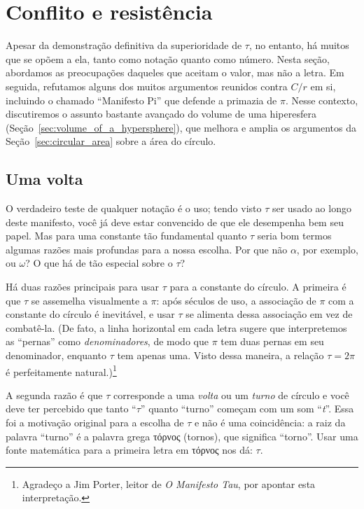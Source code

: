 {    %


\section{Conflito e resistência} %
\label{sec:conflict_and_resistance}

Apesar da demonstração definitiva da superioridade de $\tau$, no entanto, há muitos que se opõem a ela, tanto como notação quanto como número. Nesta seção, abordamos as preocupações daqueles que aceitam o valor, mas não a letra. Em seguida, refutamos alguns dos muitos argumentos reunidos contra $C/r$ em si, incluindo o chamado ``Manifesto Pi'' que defende a primazia de $\pi$. Nesse contexto, discutiremos o assunto bastante avançado do volume de uma hiperesfera (Seção~\ref{sec:volume_of_a_hypersphere}), que melhora e amplia os argumentos da Seção~\ref{sec:circular_area} sobre a área do círculo.

  \subsection{Uma volta} %
  \label{sec:one_turn}

O verdadeiro teste de qualquer notação é o uso; tendo visto $\tau$ ser usado ao longo deste manifesto, você já deve estar convencido de que ele desempenha bem seu papel. Mas para uma constante tão fundamental quanto $\tau$ seria bom termos algumas razões mais profundas para a nossa escolha. Por que não $\alpha$, por exemplo, ou $\omega$? O que há de tão especial sobre o $\tau$?

Há duas razões principais para usar $\tau$ para a constante do círculo. A primeira é que $\tau$ se assemelha visualmente a $\pi$: após séculos de uso, a associação de $\pi$ com a constante do círculo é inevitável, e usar $\tau$ se alimenta dessa associação em vez de combatê-la. (De fato, a linha horizontal em cada letra sugere que interpretemos as ``pernas'' como \emph{denominadores}, de modo que $\pi$ tem duas pernas em seu denominador, enquanto $\tau$ tem apenas uma. Visto dessa maneira, a relação $\tau = 2\pi$ é perfeitamente natural.)\footnote{Agradeço a Jim Porter, leitor de \emph{O Manifesto Tau}, por apontar esta interpretação.}

A segunda razão é que $\tau$ corresponde a uma \emph{volta} ou um \emph{turno} de círculo e você deve ter percebido que tanto ``$\tau$'' quanto ``turno'' começam com um som ``\emph{t}''. Essa foi a motivação original para a escolha de $\tau$ e não é uma coincidência: a raiz da palavra ``turno'' é a palavra grega τόρνος (tornos), que significa ``torno''. Usar uma fonte matemática para a primeira letra em τόρνος nos dá: $\tau$.

}
